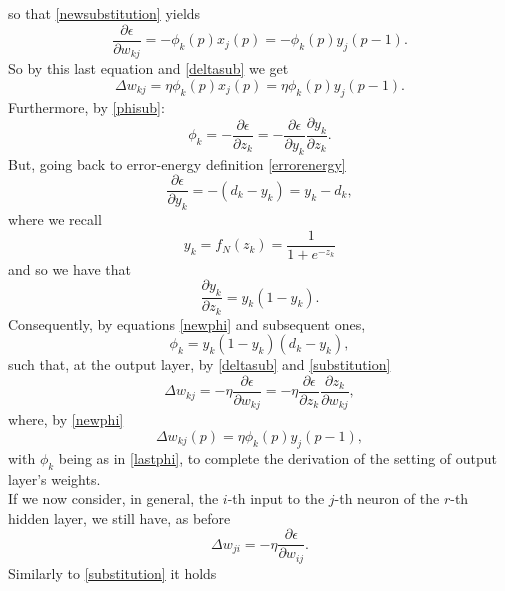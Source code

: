 \documentclass[%
    corpo=11pt,
    twoside,
    stile=classica,
    oldstyle,
    autoretitolo,
    tipotesi=magistrale,
    greek,
    evenboxes,
    english
]{toptesi}
\begin{document}
so that \ref{newsubstitution} yields 
\begin{equation}
\frac{\partial \epsilon}{\partial w_{kj}} = - \phi_k(p)x_j(p) = -\phi_k(p)y_j(p-1).
\end{equation}
So by this last equation and \ref{deltasub} we get
\begin{equation}
\label{graupe6p12}
\Delta w_{kj} = \eta \phi_k(p)x_j(p) = \eta \phi_k(p)y_j(p-1).
\end{equation}
Furthermore, by \ref{phisub}:
\begin{equation}
\label{newphi}
\phi_k = - \frac{\partial \epsilon}{\partial z_k} = - \frac{\partial \epsilon}{\partial y_k} \frac{\partial y_k}{\partial z_k}.
\end{equation}
But, going back to error-energy definition \ref{errorenergy}
\begin{equation}
\frac{\partial \epsilon}{\partial y_k} = -\left(d_k - y_k \right) = y_k - d_k,
\end{equation}
where we recall 
\begin{equation}
y_k = f_N(z_k) = \frac{1}{1 + e^{-z_k}}
\end{equation}
and so we have that 
\begin{equation}
\label{graupe6p16}
\frac{\partial y_k}{\partial z_k} = y_k(1 - y_k).
\end{equation}
Consequently, by equations \ref{newphi} and subsequent ones, 
\begin{equation}
\label{lastphi}
\phi_k = y_k(1 - y_k)(d_k - y_k),
\end{equation}
such that, at the output layer, by \ref{deltasub} and \ref{substitution}
\begin{equation}
\Delta w_{kj} = -\eta \frac{\partial \epsilon}{\partial w_{kj}} = -\eta  \frac{\partial \epsilon}{\partial z_k} \frac{\partial z_k}{\partial w_{kj}},
\end{equation}
where, by \ref{newphi}
\begin{equation}
\Delta w_{kj}(p) = \eta \phi_k(p)y_j(p-1),
\end{equation}
with $\phi_k$ being as in \ref{lastphi}, to complete the derivation of the setting of output layer's weights. \\
If we now consider, in general, the $i$-th input to the $j$-th neuron of the $r$-th hidden layer, we still have, as before
\begin{equation}
\Delta w_{ji} = -\eta \frac{\partial \epsilon}{\partial w_{ij}}.
\end{equation}
Similarly to \ref{substitution} it holds
\end{document}
